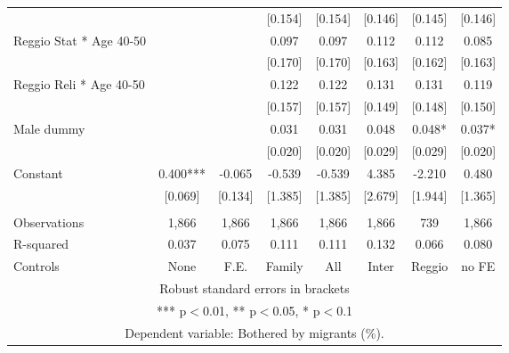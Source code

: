 \begin{tabular}{lccccccc}
 &  &  & [0.154] & [0.154] & [0.146] & [0.145] & [0.146] \\
Reggio Stat * Age 40-50 &  &  & 0.097 & 0.097 & 0.112 & 0.112 & 0.085 \\
 &  &  & [0.170] & [0.170] & [0.163] & [0.162] & [0.163] \\
Reggio Reli * Age 40-50 &  &  & 0.122 & 0.122 & 0.131 & 0.131 & 0.119 \\
 &  &  & [0.157] & [0.157] & [0.149] & [0.148] & [0.150] \\
Male dummy &  &  & 0.031 & 0.031 & 0.048 & 0.048* & 0.037* \\
 &  &  & [0.020] & [0.020] & [0.029] & [0.029] & [0.020] \\
Constant & 0.400*** & -0.065 & -0.539 & -0.539 & 4.385 & -2.210 & 0.480 \\
 & [0.069] & [0.134] & [1.385] & [1.385] & [2.679] & [1.944] & [1.365] \\
 &  &  &  &  &  &  &  \\
Observations & 1,866 & 1,866 & 1,866 & 1,866 & 1,866 & 739 & 1,866 \\
R-squared & 0.037 & 0.075 & 0.111 & 0.111 & 0.132 & 0.066 & 0.080 \\
 Controls & None & F.E. & Family & All & Inter & Reggio & no FE \\ \hline
\multicolumn{8}{c}{ Robust standard errors in brackets} \\
\multicolumn{8}{c}{ *** p$<$0.01, ** p$<$0.05, * p$<$0.1} \\
\multicolumn{8}{c}{ Dependent variable: Bothered by migrants (\%).} \\
\end{tabular}
